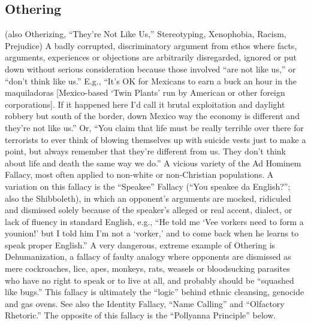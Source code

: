 \documentclass[10pt,a4paper,british]{article}
\begin{document}
\begin{multicols}{2}
    \subsection{Othering} (also Otherizing, ``They're Not Like Us,'' Stereotyping,
    Xenophobia, Racism, Prejudice) A badly corrupted, discriminatory argument
    from ethos where facts, arguments, experiences or objections are
    arbitrarily disregarded, ignored or put down without serious consideration
    because those involved ``are not like us,'' or ``don't think like us.''
    E.g., ``It's OK for Mexicans to earn a buck an hour in the maquiladoras
    [Mexico{-}based `Twin Plants' run by American or other foreign
    corporations]. If it happened here I'd call it brutal exploitation and
    daylight robbery but south of the border, down Mexico way the economy is
    different and they're not like us.''  Or, ``You claim that life must be
    really terrible over there for terrorists to ever think of blowing
    themselves up with suicide vests just to make a point, but always remember
    that they're different from us. They don't think about life and death the
    same way we do.'' A vicious variety of the Ad Hominem Fallacy, most often
    applied to non{-}white or non{-}Christian populations. A variation on this
    fallacy is the ``Speakee'' Fallacy (``You speakee da English?''; also the
    Shibboleth), in which an opponent's arguments are mocked, ridiculed and
    dismissed solely because of the speaker's alleged or real accent, dialect,
    or lack of fluency in standard English, e.g., ``He told me `Vee vorkers
    need to form a younion!' but I told him I'm not a `vorker,' and to come
    back when he learns to speak proper English.'' A very dangerous, extreme
    example of Othering is Dehumanization, a fallacy of faulty analogy where
    opponents are dismissed as mere cockroaches, lice, apes, monkeys, rats,
    weasels or bloodsucking parasites who have no right to speak or to live at
    all, and probably should be ``squashed like bugs.'' This fallacy is
    ultimately the ``logic'' behind ethnic cleansing, genocide and gas ovens.
    See also the Identity Fallacy, ``Name Calling'' and ``Olfactory Rhetoric.''
    The opposite of this fallacy is the ``Pollyanna Principle'' below.


\end{multicols}
\end{document}
